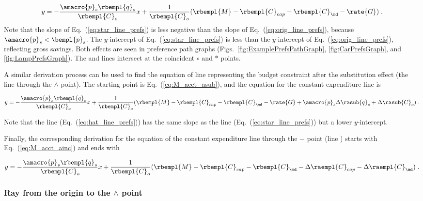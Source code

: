 \begin{equation} \label{eq:star_line_prefs}
  y = - \frac{\amacro{p}_s \rbempl{q}_s}{\rbempl{C}_o} x
         + \frac{1}{\rbempl{C}_o} (\rbempl{M} - \rbempl{C}_{cap} - \rbempl{C}_{\md} - \rate{G}) \; .
\end{equation}
%
Note that the slope of Eq.~(\ref{eq:star_line_prefs}) is less negative
than the slope of Eq.~(\ref{eq:orig_line_prefs}), 
because $\amacro{p}_s < \bempl{p}_s$.
The $y$-intercept of Eq.~(\ref{eq:star_line_prefs}) is less than the 
$y$-intercept of Eq.~(\ref{eq:orig_line_prefs}),
reflecting gross savings.
Both effects are seen in
preference path graphs 
(Figs.~\ref{fig:ExamplePrefsPathGraph}, \ref{fig:CarPrefsGraph}, and \ref{fig:LampPrefsGraph}).
The \circcirc{} and \starstar{} lines intersect at the coincident $\circ$ and $*$ points.

A similar derivation process can be used to find the equation of 
line representing the budget constraint
after the substitution effect (the \hathat{} line through the $\wedge$ point).
The starting point is Eq.~(\ref{eq:M_acct_asub}), and 
the equation for the constant expenditure line is

\begin{equation} \label{eq:hat_line_prefs}
  y = - \frac{\amacro{p}_s \rbempl{q}_s}{\rbempl{C}_o} x
         + \frac{1}{\rbempl{C}_o} (\rbempl{M} - \rbempl{C}_{cap} - \rbempl{C}_{\md} 
                                   - \rate{G} + \amacro{p}_s \Delta \rasub{q}_s + \Delta \rasub{C}_o) \; .
\end{equation}

Note that the \hathat{} line (Eq.~(\ref{eq:hat_line_prefs})) has the same slope as 
the \starstar{} line (Eq.~(\ref{eq:star_line_prefs}))
but a lower $y$-intercept.

Finally, the corresponding derivation
for the equation of the constant expenditure line through the 
$-$ point (line \barbar{}) starts with Eq.~(\ref{eq:M_acct_ainc}) and ends with 

\begin{equation} \label{eq:bar_line_prefs}
  y = - \frac{\amacro{p}_s \rbempl{q}_s}{\rbempl{C}_o} x
        + \frac{1}{\rbempl{C}_o} (\rbempl{M} - \rbempl{C}_{cap} - \rbempl{C}_{\md} 
                                   - \Delta \raempl{C}_{cap} - \Delta \raempl{C}_{\md}) \; .
\end{equation}


\subsubsection{Ray from the origin to the $\wedge$ point} 
\label{sec:pref_graph_ray}

